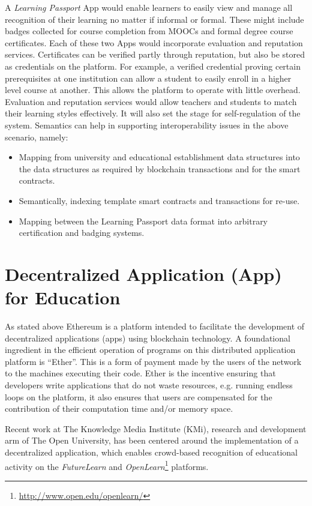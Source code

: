 A \emph{Learning Passport} \DJ{}App would enable learners to easily view and manage all recognition of their learning no matter if informal or formal. 
These might include badges collected for course completion from MOOCs and formal degree course certificates. 
Each of these two \DJ{}Apps would incorporate evaluation and reputation services. 
Certificates can be verified partly through reputation, but also be stored as credentials on the platform. 
For example, a verified credential proving certain prerequisites at one institution can allow a student to easily enroll in a higher level course at another. 
This allows the platform to operate with little overhead. 
Evaluation and reputation services would allow teachers and students to match their learning styles effectively. 
It will also set the stage for self-regulation of the system. 
Semantics can help in supporting interoperability issues in the above scenario, namely:
\begin{itemize}
    \item Mapping from university and educational establishment data structures into the data structures as required by blockchain transactions and for the smart contracts.
    \item Semantically, indexing template smart contracts and transactions for re-use.
    \item Mapping between the Learning Passport data format into arbitrary certification and badging systems.
\end{itemize}

\section{Decentralized Application (\DJ{}App) for Education}

As stated above Ethereum is a platform intended to facilitate the development of decentralized applications (\DJ{}apps) using blockchain technology. 
A foundational ingredient in the efficient operation of programs on this distributed application platform is ``Ether''. 
This is a form of payment made by the users of the network to the machines executing their code. 
Ether is the incentive ensuring that developers write applications that do not waste resources, e.g. running endless loops on the platform, it also ensures that users are compensated for the contribution of their computation time and/or memory space.

Recent work at The Knowledge Media Institute (KMi), research and development arm of The Open University, has been centered around the implementation of a decentralized application, which enables crowd-based recognition of educational activity on the \emph{FutureLearn} and \emph{OpenLearn}\footnote{\url{http://www.open.edu/openlearn/}} platforms. 

